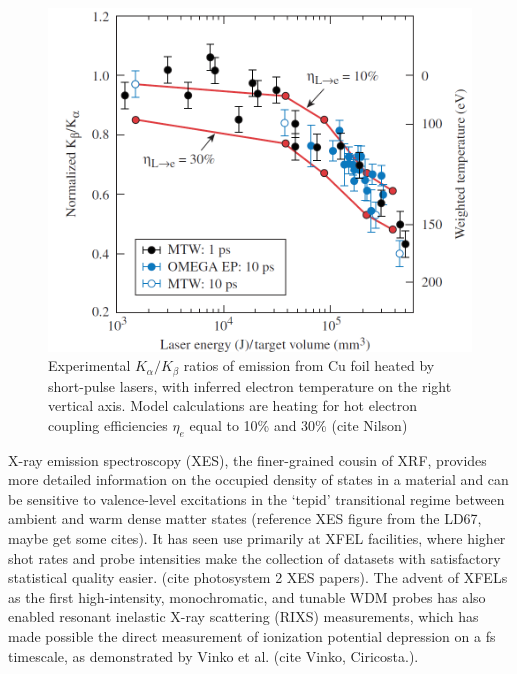 \begin{figure}[h] \label{fig:nilson}
\caption{Experimental $K_\alpha/K_\beta$ ratios of emission from Cu foil heated by short-pulse lasers, with inferred electron temperature on the right vertical axis. Model calculations are heating for hot electron coupling efficiencies $\eta_e$ equal to 10\% and 30\% (cite Nilson)}
\centering
\includegraphics[scale=0.5]{../Figures/nilson_branching.png}
\end{figure}

X-ray emission spectroscopy (XES), the finer-grained cousin of XRF, provides more detailed information on the occupied density of states in a material and can be sensitive to valence-level excitations in the `tepid' transitional regime between ambient and warm dense matter states (reference XES figure from the LD67, maybe get some cites). It has seen use primarily at XFEL facilities, where higher shot rates and probe intensities make the collection of datasets with satisfactory statistical quality easier. (cite photosystem 2 XES papers). The advent of XFELs as the first high-intensity, monochromatic, and tunable WDM probes has also enabled resonant inelastic X-ray scattering (RIXS) measurements, which has made possible the direct measurement of ionization potential depression on a fs timescale, as demonstrated by Vinko et al. (cite Vinko, Ciricosta.).



